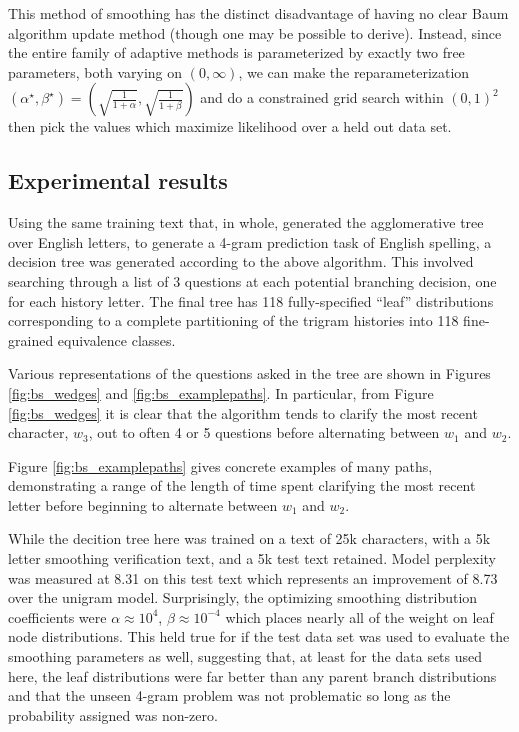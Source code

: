 \documentclass[12pt]{article}
\begin{document}
This method of smoothing has the distinct disadvantage of having no
clear Baum algorithm update method (though one may be possible to
derive). Instead, since the entire family of adaptive methods is
parameterized by exactly two free parameters, both varying on $(0,
\infty)$, we can make the reparameterization $(\alpha^\star,
\beta^\star) = \left(\sqrt{\frac{1}{1+\alpha}},
  \sqrt{\frac{1}{1+\beta}}\right)$ and do a constrained grid search
within $(0,1)^2$ then pick the values which maximize likelihood over a
held out data set.

\subsection{Experimental results}

Using the same training text that, in whole, generated the
agglomerative tree over English letters, to generate a 4-gram
prediction task of English spelling, a decision tree was generated
according to the above algorithm. This involved searching through a
list of 3 questions at each potential branching decision, one for each
history letter. The final tree has 118 fully-specified ``leaf''
distributions corresponding to a complete partitioning of the trigram
histories into 118 fine-grained equivalence classes.

Various representations of the questions asked in the tree are shown
in Figures \ref{fig:bs_wedges} and \ref{fig:bs_examplepaths}. In
particular, from Figure \ref{fig:bs_wedges} it is clear that the
algorithm tends to clarify the most recent character, $w_3$, out to
often 4 or 5 questions before alternating between $w_1$ and $w_2$.

Figure \ref{fig:bs_examplepaths} gives concrete examples of many
paths, demonstrating a range of the length of time spent clarifying
the most recent letter before beginning to alternate between $w_1$ and
$w_2$.


While the decition tree here was trained on a text of 25k characters,
with a 5k letter smoothing verification text, and a 5k test text
retained. Model perplexity was measured at 8.31 on this test text
which represents an improvement of 8.73 over the unigram
model. Surprisingly, the optimizing smoothing distribution
coefficients were $\alpha \approx 10^{4}$, $\beta \approx 10^{-4}$ which places
nearly all of the weight on leaf node distributions. This held true
for if the test data set was used to evaluate the smoothing parameters
as well, suggesting that, at least for the data sets used here, the
leaf distributions were far better than any parent branch
distributions and that the unseen 4-gram problem was not problematic
so long as the probability assigned was non-zero.
\end{document}
